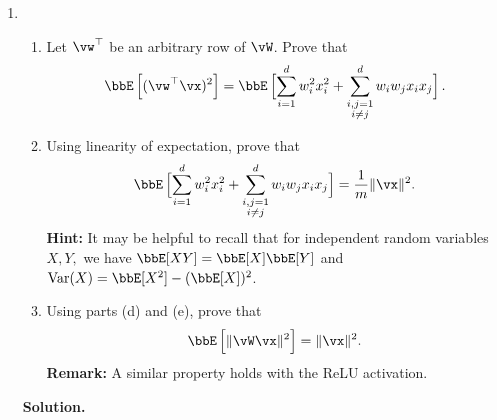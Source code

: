 \documentclass{article}
\theoremstyle{definition}
\theoremstyle{remark}
\newenvironment{Q}
{%
\clearpage
\item
}
{%
\phantom{s}%
\bigskip%
\noindent\textbf{Solution.}
}
\begin{document}
\begin{enumerate}[font={\Large\bfseries},left=0pt]
\begin{Q}
    \begin{enumerate}[resume]
      \item Let $\vw^\top$ be an arbitrary row of $\vW$. Prove that
        \begin{align*}
          \bbE\sbr{ (\vw^\top \vx)^2 } = \bbE\sbr[2]{ \sum_{i=1}^d w_i^2 x_i^2 + \sum_{\substack{i,j=1\\i\neq j}}^d w_iw_jx_ix_j}.
        \end{align*}
      
      \item Using linearity of expectation, prove that
        \begin{align*}
          \bbE\sbr[2]{ \sum_{i=1}^d w_i^2 x_i^2 + \sum_{\substack{i,j=1\\i\neq j}}^d w_iw_jx_ix_j} = \frac 1 m \|\vx\|^2.
        \end{align*}
      \textbf{Hint:} It may be helpful to recall that for independent random variables $X,Y,$ we have $\bbE[XY] = \bbE[X] \bbE[Y]$ and $\operatorname{Var}(X) = \bbE[X^2] - (\bbE[X])^2$.
      \item Using parts (d) and (e), prove that
        \begin{align*}
          \bbE\sbr{ \|\vW\vx\|^2 } = \|\vx\|^2.
        \end{align*}
      \textbf{Remark:} A similar property holds with the ReLU activation.
    \end{enumerate}

\end{Q}
\end{enumerate}

\newpage

\end{document}
